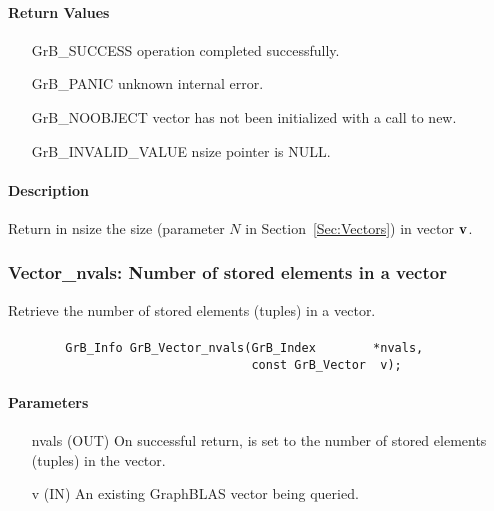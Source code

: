 \paragraph{Return Values}

\begin{itemize}[leftmargin=2.1in]
\item[{\sf GrB\_SUCCESS}]   operation completed successfully.
\item[{\sf GrB\_PANIC}]     unknown internal error.
\item[{\sf GrB\_NOOBJECT}]  vector has not been initialized with a call to {\sf new}.
\item[{\sf GrB\_INVALID\_VALUE}]    {\sf nsize} pointer is {\sf NULL}.
\end{itemize}

\paragraph{Description}

Return in {\sf nsize} the size (parameter $N$ in Section~\ref{Sec:Vectors}) in vector ${\bf v}$.

\subsubsection{{\sf Vector\_nvals}: Number of stored elements in a vector}

Retrieve the number of stored elements (tuples) in a vector.

\paragraph{\syntax}

\begin{verbatim}
        GrB_Info GrB_Vector_nvals(GrB_Index        *nvals,
                                  const GrB_Vector  v);
\end{verbatim}

\paragraph{Parameters}

\begin{itemize}[leftmargin=1.1in]
    \item[{\sf nvals}] ({\sf OUT}) On successful return, is set to the number of 
                                   stored elements (tuples) in the vector.
    \item[{\sf v}]     ({\sf IN})  An existing GraphBLAS vector being queried.
\end{itemize}



